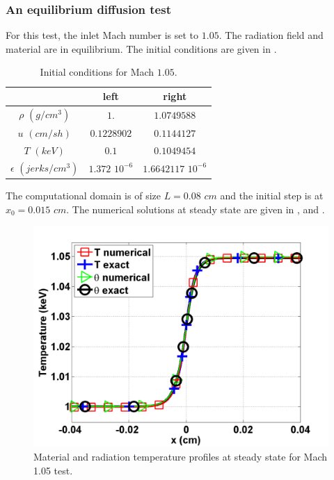 \subsubsection{An equilibrium diffusion test}

For this test, the inlet Mach number is set to $1.05$. The radiation field and material are in equilibrium. The initial conditions are given in .
\begin{table}[h]
\begin{center}
\caption{\label{tbl:table3} Initial conditions for Mach $1.05$.}
\begin{tabular}{|c|c|c|}
\hline 
 & left  & right \\ \hline
$\rho$ $(g/cm^3)$ &$1.$ & $1.0749588$ \\ \hline
$u$ $(cm/sh)$& $0.1228902$ & $0.1144127$ \\ \hline
$T$ $(keV)$& $0.1$ & $0.1049454$\\ \hline
$\epsilon$ $(jerks/cm^3)$ & $1.372$ $10^{-6}$ & $1.6642117$ $10^{-6}$\\
\hline
\end{tabular}
\end{center}  
\end{table}  
The computational domain is of size $L=0.08$ $cm$ and the initial step is at $x_0 = 0.015$ $cm$. The numerical solutions at steady state are given in ,  and . 
\begin{figure}[H]
                \centering
                \includegraphics[width=\textwidth]{figures/Mach_1p05_nel_500_temperature.png}
        \caption{Material and radiation temperature profiles at steady state for Mach 1.05 test.}\label{fig:Mach105_temp}
\end{figure}
